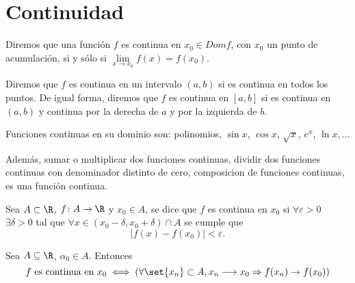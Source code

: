 \section{Continuidad}
\begin{definition}
	Diremos que una función \(f \) es continua en \(x_0 \in Domf\), con \(x_0 \) un punto de acumulación, si y sólo si \(\lim\limits_{x  \to x_0 } f(x)= f(x_0 )\).

	Diremos que \(f \) es continua en un intervalo \((a,b )\) si es continua en todos los puntos. De igual forma, diremos que \(f \) es continua en \([a,b ]\) si es continua en \((a,b )\) y continua por la derecha de \(a \) y por la izquierda de \(b \).
\end{definition}
\begin{example}
	Funciones continuas en su dominio son: polinomios, \(\sin x\), \(\cos x\), \(\sqrt{x }\), \(e^{x}\), \(\ln x, \ldots\)
\end{example}
Además, sumar o multiplicar dos funciones continuas, dividir dos funciones continuas con denominador distinto de cero, composicion de funciones continuas, es una función continua.
\begin{definition}
	Sea \(A \subset \R \), \(f\colon A \to \R \) y \(x_0 \in A \), se dice que \(f \) es continua en \(x_0 \) si \(\forall \varepsilon > 0 \) \(\exists \delta > 0 \) tal que \(\forall x \in (x_0 - \delta, x_0 + \delta) \cap A\) se cumple que
	\[
		\left\vert f(x) - f(x_0 ) \right\vert < \varepsilon.
	\]
\end{definition}

\begin{theorem}
	Sea \(A \subseteq \R \), \(\alpha_0 \in A \). Entonces
	\[
		f \text{ es continua en } x_0 \iff (\forall \set{x_n} \subset A, x_n \longrightarrow x_0 \Rightarrow f(x_n) \rightarrow f(x_0))
	\]
\end{theorem}
